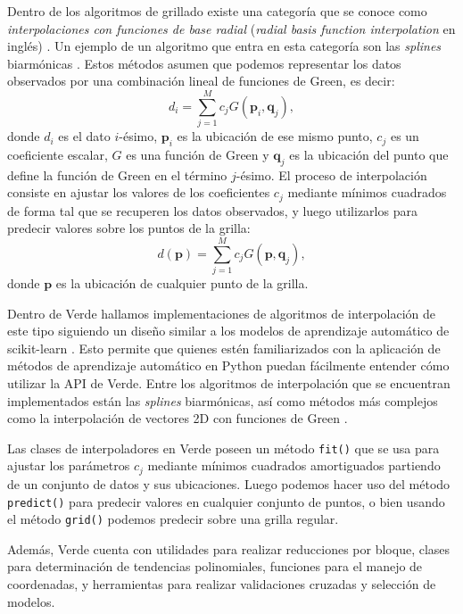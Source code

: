 Dentro de los algoritmos de grillado existe una categoría que se conoce como
\emph{interpolaciones con funciones de base radial} (\emph{radial basis
function interpolation} en inglés) \citep{franke1982}.
Un ejemplo de un algoritmo que entra en esta categoría son las \emph{splines}
biarmónicas \citep{sandwell1987}.
Estos métodos asumen que podemos representar los datos observados por una
combinación lineal de funciones de Green, es decir:
%
\begin{equation}
    d_i = \sum_{j=1}^M c_j G(\mathbf{p}_i, \mathbf{q}_j),
\end{equation}
%
donde $d_i$ es el dato $i$-ésimo, $\mathbf{p}_i$ es la ubicación de
ese mismo punto, $c_j$ es un coeficiente escalar, $G$ es una función de Green y
$\mathbf{q}_j$ es la ubicación del punto que define la función de Green en el
término $j$-ésimo.
El proceso de interpolación consiste en ajustar los valores de los
coeficientes $c_j$ mediante mínimos cuadrados de forma tal que se recuperen los
datos observados, y luego utilizarlos para predecir valores sobre los puntos de
la grilla:
%
\begin{equation}
    d(\mathbf{p}) = \sum_{j=1}^M c_j G(\mathbf{p}, \mathbf{q}_j),
\end{equation}
%
donde $\mathbf{p}$ es la ubicación de cualquier punto de la grilla.

Dentro de Verde hallamos implementaciones de algoritmos de interpolación de
este tipo siguiendo un diseño similar a los modelos de aprendizaje automático
de scikit-learn \citep{sklearn2011}.
Esto permite que quienes estén familiarizados con la aplicación de métodos de
aprendizaje automático en Python puedan fácilmente entender cómo utilizar la
\ac{API} de Verde.
Entre los algoritmos de interpolación que se encuentran implementados están las
\emph{splines} biarmónicas, así como métodos más complejos como la
interpolación de vectores 2D con funciones de Green \citep{sandwell2016}.

Las clases de interpoladores en Verde poseen un método \texttt{fit()} que se
usa para ajustar los parámetros $c_j$ mediante mínimos cuadrados amortiguados
partiendo de un conjunto de datos y sus ubicaciones.
Luego podemos hacer uso del método \texttt{predict()} para predecir valores en
cualquier conjunto de puntos, o bien usando el método \texttt{grid()} podemos
predecir sobre una grilla regular.

Además, Verde cuenta con utilidades para realizar reducciones por
bloque, clases para determinación de tendencias polinomiales, funciones
para el manejo de coordenadas, y herramientas para realizar validaciones
cruzadas y selección de modelos.

